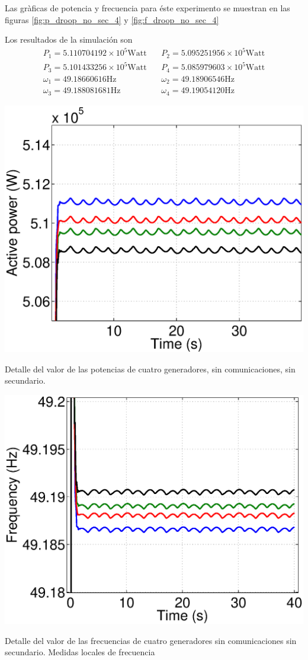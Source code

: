 \documentclass{tufte-handout}
\begin{document}
Las gràficas de potencia y frecuencia para éste experimento se muestran en las figuras \ref{fig:p_droop_no_sec_4} y \ref{fig:f_droop_no_sec_4}

Los resultados de la simulación son
\begin{align}
    P_1=5.110704192\times10^5 \text{Watt} &\, &  P_2=5.095251956\times10^5 \text{Watt}\\
    P_3=5.101433256\times10^5  \text{Watt}& \, & P_4= 5.085979603\times10^5  \text{Watt}\\
    \omega_1=49.18660616 \text{Hz} &\, & \omega_2=49.18906546\text{Hz}\\
    \omega_3=49.188081681  \text{Hz}&\,& \omega_4=49.19054120  \text{Hz}
\end{align}
\begin{marginfigure}%
  \includegraphics[width=\linewidth]{P_no_comm_no_sec_4}
  \caption{Detalle del valor de las potencias de cuatro generadores, sin comunicaciones, sin secundario.}
  \label{fig:p_droop_no_sec_4}
\end{marginfigure}
\begin{marginfigure}%
  \includegraphics[width=\linewidth]{F_no_comm_no_sec_4}
  \caption{Detalle del valor de las frecuencias de cuatro generadores sin comunicaciones sin secundario. Medidas locales de frecuencia}
  \label{fig:f_droop_no_sec_4}
\end{marginfigure}
\end{document}
